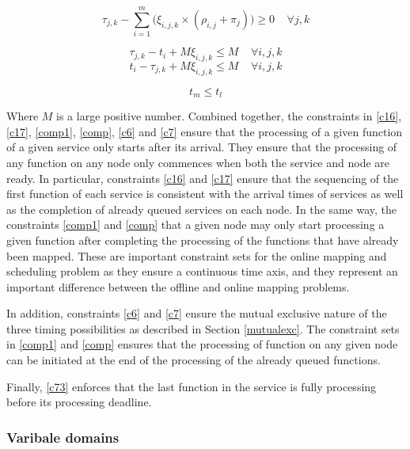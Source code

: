 \documentclass[conference]{IEEEtran}
\begin{document}
\begin{equation}
\tau_{j,k} - \sum\limits_{i=1}^{m}  \Big(\xi_{i,j,k} \times (\rho_{i,j}+ \pi_j)\Big) \geq 0 \ \ \ \ \ \forall j, k
\label{comp}
\end{equation}



\begin{equation}
\tau_{j,k} - t_{i} + M \xi_{i,j,k} \leq M \ \ \ \ \   \forall i,j,k
\label{c6}
\end{equation}
\begin{equation}
 t_{i} - \tau_{j,k} +  M \xi_{i,j,k} \leq M \ \ \ \ \   \forall i,j,k
\label{c7}
\end{equation}

\begin{equation}
 t_{m}  \leq t_l
\label{c73}
\end{equation}

Where $M$ is a large positive number. Combined together, the constraints in \eqref{c16}, \eqref{c17}, \eqref{comp1}, \eqref{comp}, \eqref{c6} and \eqref{c7} ensure that the processing of a given function of a given service only starts after its arrival. They ensure that the processing of any function on any node only commences when both the service and node are ready. In particular, constraints \eqref{c16} and \eqref{c17} ensure that the sequencing of the first function of each service is consistent with the arrival times of services as well as the completion of already queued services on each node. In the same way, the constraints \eqref{comp1} and \eqref{comp} that a given node may only start processing a given function after completing the processing of the functions that have already been mapped. These are important constraint sets for the online mapping and scheduling problem as they ensure a continuous time axis, and they represent an important difference between the offline and online mapping problems. 

In addition, constraints \eqref{c6} and \eqref{c7} ensure the mutual exclusive nature of the three timing possibilities as described in Section \ref{mutualexc}. The constraint sets in \eqref{comp1} and \eqref{comp} ensures that the processing of function on any given node can be initiated at the end of the processing of the already queued functions.

Finally, \eqref{c73} enforces that the last function in the service is fully processing before its processing deadline.

\subsubsection{Varibale domains}
\end{document}
